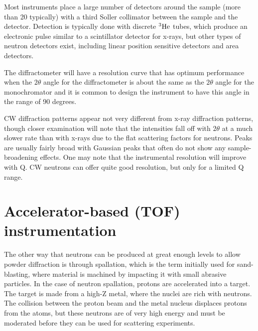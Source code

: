 Most instruments place a large number of detectors around the sample (more than 20 typically) with a third Soller collimator between the sample and the detector. Detection is typically done with discrete ${}^3\rm{He}$ tubes, which produce an electronic pulse similar to a scintillator detector for x-rays, but other types of neutron detectors exist, including linear position sensitive detectors and area detectors. 

The diffractometer will have a resolution curve that has optimum performance when the $2\theta$ angle for the diffractometer is about the same as the  $2\theta$ angle for the monochromator and it is common to design the instrument to have this angle in the range of 90 degrees. 

CW diffraction patterns appear not very different from x-ray diffraction patterns, though closer examination will note that the intensities fall off with $2\theta$ at a much slower rate than with x-rays due to the flat scattering factors for neutrons. Peaks are usually fairly broad with Gaussian peaks that often do not show any sample-broadening effects. One may note that the instrumental resolution will improve with Q. CW neutrons can offer quite good resolution, but only for a limited Q range. 

\section{Accelerator-based (TOF) instrumentation}

The other way that neutrons can be produced at great enough levels to allow powder diffraction is through spallation, which is the term initially used for sand-blasting, where material is machined by impacting it with small abrasive particles. In the case of neutron spallation, protons are accelerated into a target. The target is made from a high-Z metal, where the nuclei are rich with neutrons. The collision between the proton beam and the metal nucleus displaces protons from the atoms, but these neutrons are of very high energy and must be moderated before they can be used for scattering experiments. 

